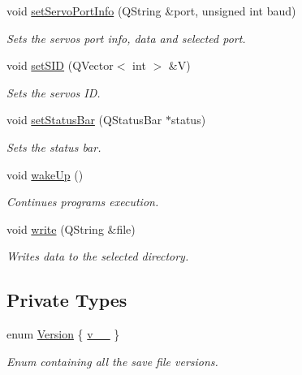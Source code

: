 \begin{DoxyCompactItemize}
void \hyperlink{class_servo_thread_a76af3e89d1a8705426584bedb0624909}{set\+Servo\+Port\+Info} (Q\+String \&port, unsigned int baud)
\begin{DoxyCompactList}\small\item\em Sets the servos port info, data and selected port. \end{DoxyCompactList}\item 
void \hyperlink{class_servo_thread_ac3471e5020f5d9babd3f2ff7b3b82aca}{set\+S\+I\+D} (Q\+Vector$<$ int $>$ \&V)
\begin{DoxyCompactList}\small\item\em Sets the servos I\+D. \end{DoxyCompactList}\item 
void \hyperlink{class_servo_thread_a2d05e011577cf2783978a9837114e29e}{set\+Status\+Bar} (Q\+Status\+Bar $\ast$status)
\begin{DoxyCompactList}\small\item\em Sets the status bar. \end{DoxyCompactList}\item 
void \hyperlink{class_servo_thread_a5f32574f843d76deffec45995028389b}{wake\+Up} ()
\begin{DoxyCompactList}\small\item\em Continues program\textquotesingle{}s execution. \end{DoxyCompactList}\item 
void \hyperlink{class_servo_thread_ae5753b8c12768d2115ff900f0ab8e13c}{write} (Q\+String \&file)
\begin{DoxyCompactList}\small\item\em Writes data to the selected directory. \end{DoxyCompactList}\end{DoxyCompactItemize}
\subsection*{Private Types}
\begin{DoxyCompactItemize}
\item 
enum \hyperlink{class_servo_thread_aeccce0ac6a969e2ee7cbe91687e2d085}{Version} \{ \hyperlink{class_servo_thread_aeccce0ac6a969e2ee7cbe91687e2d085a319b6bf2cb120faeefbd0a5118ece7e3}{v\+\_\+\_}
 \}
\begin{DoxyCompactList}\small\item\em Enum containing all the save file versions. \end{DoxyCompactList}\end{DoxyCompactItemize}
